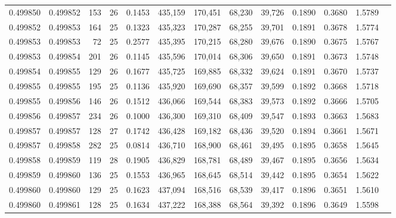 \begin{tabular}{rrrrrrrrrrrrr}
0.499850 & 0.499852 & 153 &  26 &                                     0.1453 & 435,159 & 170,451 &  68,230 &  39,726 & 0.1890 & 0.3680 & 1.5789 \\
0.499852 & 0.499853 & 164 &  25 &                                     0.1323 & 435,323 & 170,287 &  68,255 &  39,701 & 0.1891 & 0.3678 & 1.5774 \\
0.499853 & 0.499853 &  72 &  25 &                                     0.2577 & 435,395 & 170,215 &  68,280 &  39,676 & 0.1890 & 0.3675 & 1.5767 \\
0.499853 & 0.499854 & 201 &  26 &                                     0.1145 & 435,596 & 170,014 &  68,306 &  39,650 & 0.1891 & 0.3673 & 1.5748 \\
0.499854 & 0.499855 & 129 &  26 &                                     0.1677 & 435,725 & 169,885 &  68,332 &  39,624 & 0.1891 & 0.3670 & 1.5737 \\
0.499855 & 0.499855 & 195 &  25 &                                     0.1136 & 435,920 & 169,690 &  68,357 &  39,599 & 0.1892 & 0.3668 & 1.5718 \\
0.499855 & 0.499856 & 146 &  26 &                                     0.1512 & 436,066 & 169,544 &  68,383 &  39,573 & 0.1892 & 0.3666 & 1.5705 \\
0.499856 & 0.499857 & 234 &  26 &                                     0.1000 & 436,300 & 169,310 &  68,409 &  39,547 & 0.1893 & 0.3663 & 1.5683 \\
0.499857 & 0.499857 & 128 &  27 &                                     0.1742 & 436,428 & 169,182 &  68,436 &  39,520 & 0.1894 & 0.3661 & 1.5671 \\
0.499857 & 0.499858 & 282 &  25 &                                     0.0814 & 436,710 & 168,900 &  68,461 &  39,495 & 0.1895 & 0.3658 & 1.5645 \\
0.499858 & 0.499859 & 119 &  28 &                                     0.1905 & 436,829 & 168,781 &  68,489 &  39,467 & 0.1895 & 0.3656 & 1.5634 \\
0.499859 & 0.499860 & 136 &  25 &                                     0.1553 & 436,965 & 168,645 &  68,514 &  39,442 & 0.1895 & 0.3654 & 1.5622 \\
0.499860 & 0.499860 & 129 &  25 &                                     0.1623 & 437,094 & 168,516 &  68,539 &  39,417 & 0.1896 & 0.3651 & 1.5610 \\
0.499860 & 0.499861 & 128 &  25 &                                     0.1634 & 437,222 & 168,388 &  68,564 &  39,392 & 0.1896 & 0.3649 & 1.5598 \\

\end{tabular}
